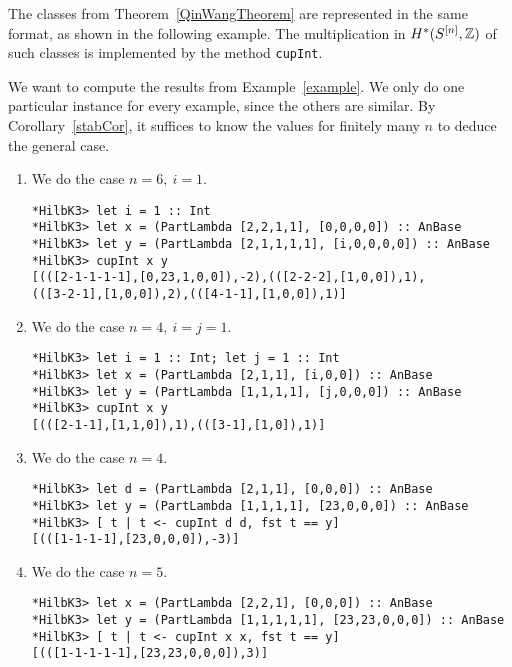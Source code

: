 The classes from Theorem~\ref{QinWangTheorem} are represented in the same format, as shown in the following example. The multiplication in $H^*(S^{[n]},\mathbb{Z})$ of such classes is implemented by the method \verb|cupInt|.
\begin{example}\label{exampleSource} We want to compute the results from Example~\ref{example}. We only do one particular instance for every example, since the others are similar. By Corollary~\ref{stabCor}, it suffices to know the values for finitely many $n$ to deduce the general case.
\begin{enumerate}
\item We do the case $n=6,\ i=1$. 
\begin{Verbatim}[fontsize=\small]
*HilbK3> let i = 1 :: Int
*HilbK3> let x = (PartLambda [2,2,1,1], [0,0,0,0]) :: AnBase
*HilbK3> let y = (PartLambda [2,1,1,1,1], [i,0,0,0,0]) :: AnBase
*HilbK3> cupInt x y
[(([2-1-1-1-1],[0,23,1,0,0]),-2),(([2-2-2],[1,0,0]),1),
(([3-2-1],[1,0,0]),2),(([4-1-1],[1,0,0]),1)]
\end{Verbatim}
\item We do the case $n=4,\ i=j=1$. 
\begin{Verbatim}[fontsize=\small]
*HilbK3> let i = 1 :: Int; let j = 1 :: Int
*HilbK3> let x = (PartLambda [2,1,1], [i,0,0]) :: AnBase
*HilbK3> let y = (PartLambda [1,1,1,1], [j,0,0,0]) :: AnBase
*HilbK3> cupInt x y
[(([2-1-1],[1,1,0]),1),(([3-1],[1,0]),1)]
\end{Verbatim}
\item We do the case $n=4$. 
\begin{Verbatim}[fontsize=\small]
*HilbK3> let d = (PartLambda [2,1,1], [0,0,0]) :: AnBase
*HilbK3> let y = (PartLambda [1,1,1,1], [23,0,0,0]) :: AnBase
*HilbK3> [ t | t <- cupInt d d, fst t == y]
[(([1-1-1-1],[23,0,0,0]),-3)]
\end{Verbatim}
\item We do the case $n=5$. 
\begin{Verbatim}[fontsize=\small]
*HilbK3> let x = (PartLambda [2,2,1], [0,0,0]) :: AnBase
*HilbK3> let y = (PartLambda [1,1,1,1,1], [23,23,0,0,0]) :: AnBase
*HilbK3> [ t | t <- cupInt x x, fst t == y]
[(([1-1-1-1-1],[23,23,0,0,0]),3)]
\end{Verbatim}
\end{enumerate}
\end{example}


